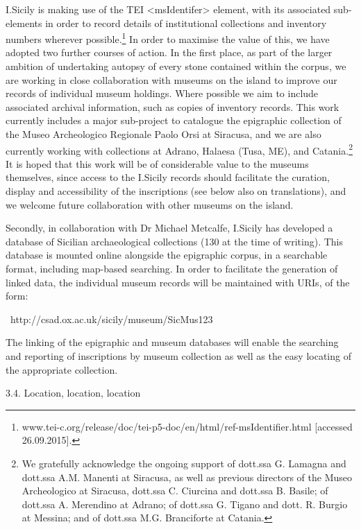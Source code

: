 \documentclass[amsthm,ebook]{saparticle}
\begin{document}
I.Sicily is making use of the TEI {\textless}msIdentifer{\textgreater} element, with its associated sub-elements in
order to record details of institutional collections and inventory numbers wherever possible.\footnote{
www.tei-c.org/release/doc/tei-p5-doc/en/html/ref-msIdentifier.html [accessed 26.09.2015].} In order to maximise the
value of this, we have adopted two further courses of action. In the first place, as part of the larger ambition of
undertaking autopsy of every stone contained within the corpus, we are working in close collaboration with museums on
the island to improve our records of individual museum holdings. Where possible we aim to include associated archival
information, such as copies of inventory records. This work currently includes a major sub-project to catalogue the
epigraphic collection of the Museo Archeologico Regionale Paolo Orsi at Siracusa, and we are also currently working
with collections at Adrano, Halaesa (Tusa, ME), and Catania.\footnote{ We gratefully acknowledge the ongoing support of
dott.ssa G. Lamagna and dott.ssa A.M. Manenti at Siracusa, as well as previous directors of the Museo Archeologico at
Siracusa, dott.ssa C. Ciurcina and dott.ssa B. Basile; of dott.ssa A. Merendino at Adrano; of dott.ssa G. Tigano and
dott. R. Burgio at Messina; and of dott.ssa M.G. Branciforte at Catania.} It is hoped that this work will be of
considerable value to the museums themselves, since access to the I.Sicily records should facilitate the curation,
display and accessibility of the inscriptions (see below also on translations), and we welcome future collaboration
with other museums on the island.

Secondly, in collaboration with Dr Michael Metcalfe, I.Sicily has developed a database of Sicilian archaeological
collections (130 at the time of writing). This database is mounted online alongside the epigraphic corpus, in a
searchable format, including map-based searching. In order to facilitate the generation of linked data, the individual
museum records will be maintained with URIs, of the form:

\ http://csad.ox.ac.uk/sicily/museum/SicMus123

The linking of the epigraphic and museum databases will enable the searching and reporting of inscriptions by museum
collection as well as the easy locating of the appropriate collection.


\bigskip

3.4. Location, location, location
\end{document}

